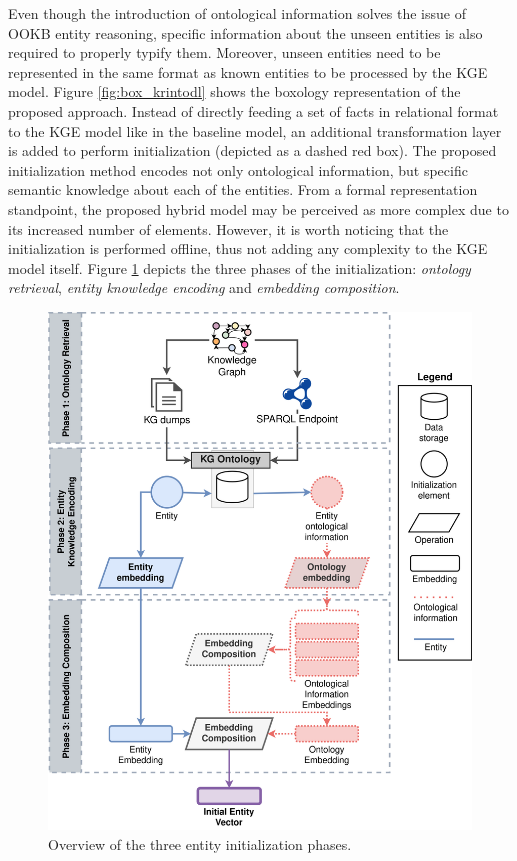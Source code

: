 Even though the introduction of ontological information solves the issue of OOKB entity reasoning, specific information about the unseen entities is also required to properly typify them. Moreover, unseen entities need to be represented in the same format as known entities to be processed by the KGE model. Figure \ref{fig:box_krintodl} shows the boxology representation of the proposed approach. Instead of directly feeding a set of facts in relational format to the KGE model like in the baseline model, an additional transformation layer is added to perform initialization (depicted as a dashed red box). The proposed initialization method encodes not only ontological information, but specific semantic knowledge about each of the entities. From a formal representation standpoint, the proposed hybrid model may be perceived as more complex due to its increased number of elements. However, it is worth noticing that the initialization is performed offline, thus not adding any complexity to the KGE model itself. Figure \ref{fig:semantic_based_initialization} depicts the three phases of the initialization: \textit{ontology retrieval}, \textit{entity knowledge encoding} and \textit{embedding composition}.

\begin{figure}
    \centering
    \includegraphics[width=.9\linewidth]{4_kbsintegrationdl/figures/Initialization_phases.eps}
    \caption{Overview of the three entity initialization phases.}
    \label{fig:semantic_based_initialization}
\end{figure}

